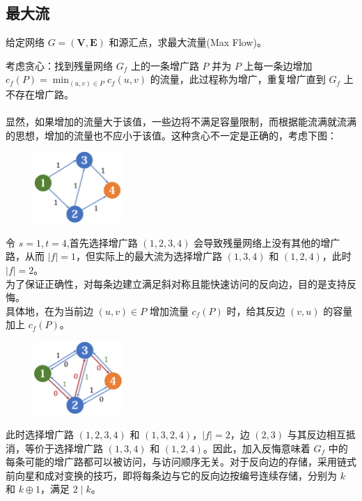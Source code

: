 \documentclass[12pt,a4paper]{article}
\begin{document}
\subsection{最大流}
\begin{mdframed}[leftline=true, linewidth=2pt, linecolor=gray]
	给定网络 $G=(\mathbf{V}, \mathbf{E})$ 和源汇点，求最大流量(Max Flow)。
\end{mdframed}
考虑贪心：找到残量网络 $G_f$ 上的一条增广路 $P$ 并为 $P$ 上每一条边增加 $\displaystyle c_f(P)=\min_{(u,v)\in P}c_f(u,v)$ 的流量，此过程称为增广，重复增广直到 $G_f$ 上不存在增广路。\\\\
显然，如果增加的流量大于该值，一些边将不满足容量限制，而根据能流满就流满的思想，增加的流量也不应小于该值。这种贪心不一定是正确的，考虑下图：
\begin{figure}[H]
	\centering
	\includegraphics[width=0.3\textwidth]{maxflow1.png}
\end{figure}
\noindent 令 $s=1, t=4$,首先选择增广路 $(1,2,3,4)$ 会导致残量网络上没有其他的增广路，从而 $|f|=1$，但实际上的最大流为选择增广路 $(1,3,4)$ 和 $(1,2,4)$，此时 $|f|=2$。\\
为了保证正确性，对每条边建立满足斜对称且能快速访问的反向边，目的是支持反悔。\\
具体地，在为当前边 $(u,v)\in P$ 增加流量 $c_f(P)$ 时，给其反边 $(v,u)$ 的容量加上 $c_f(P)$。\\
\begin{figure}[H]
	\centering
	\includegraphics[width=0.3\textwidth]{maxflow2.png}
\end{figure}
\noindent 此时选择增广路 $(1,2,3,4)$ 和 $(1,3,2,4)$，$|f|=2$，边 $(2,3)$ 与其反边相互抵消，等价于选择增广路 $(1,3,4)$ 和 $(1,2,4)$。因此，加入反悔意味着 $G_f$ 中的每条可能的增广路都可以被访问，与访问顺序无关。对于反向边的存储，采用链式前向星和成对变换的技巧，即将每条边与它的反向边按编号连续存储，分别为 $k$ 和 $k\oplus1$，满足 $2\mid k$。
\end{document}
